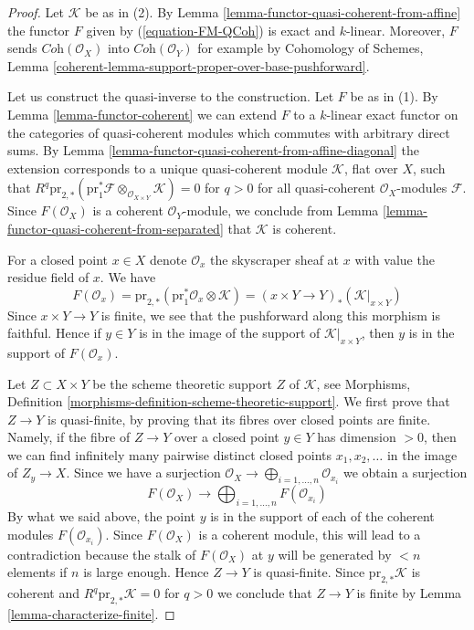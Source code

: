 \begin{proof}
Let $\mathcal{K}$ be as in (2). By
Lemma \ref{lemma-functor-quasi-coherent-from-affine}
the functor $F$ given by (\ref{equation-FM-QCoh}) is exact and $k$-linear.
Moreover, $F$ sends $\textit{Coh}(\mathcal{O}_X)$ into
$\textit{Coh}(\mathcal{O}_Y)$ for example by
Cohomology of Schemes, Lemma
\ref{coherent-lemma-support-proper-over-base-pushforward}.

\medskip\noindent
Let us construct the quasi-inverse to the construction. Let $F$ be
as in (1). By Lemma \ref{lemma-functor-coherent} we can extend $F$
to a $k$-linear exact functor on the
categories of quasi-coherent modules which commutes with arbitrary direct sums.
By Lemma \ref{lemma-functor-quasi-coherent-from-affine-diagonal}
the extension corresponds to a unique quasi-coherent module
$\mathcal{K}$, flat over $X$, such that
$R^q\text{pr}_{2, *}(\text{pr}_1^*\mathcal{F}
\otimes_{\mathcal{O}_{X \times Y}} \mathcal{K}) = 0$ for $q > 0$
for all quasi-coherent $\mathcal{O}_X$-modules $\mathcal{F}$.
Since $F(\mathcal{O}_X)$ is a coherent $\mathcal{O}_Y$-module, we
conclude from Lemma \ref{lemma-functor-quasi-coherent-from-separated}
that $\mathcal{K}$ is coherent.

\medskip\noindent
For a closed point $x \in X$ denote $\mathcal{O}_x$ the skyscraper sheaf
at $x$ with value the residue field of $x$. We have
$$
F(\mathcal{O}_x) =
\text{pr}_{2, *}(\text{pr}_1^*\mathcal{O}_x \otimes \mathcal{K}) =
(x \times Y \to Y)_*(\mathcal{K}|_{x \times Y})
$$
Since $x \times Y \to Y$ is finite, we see that the pushforward along
this morphism is faithful. Hence if $y \in Y$ is in the image of the
support of $\mathcal{K}|_{x \times Y}$, then $y$ is in the support of
$F(\mathcal{O}_x)$.

\medskip\noindent
Let $Z \subset X \times Y$ be the scheme theoretic support $Z$ of
$\mathcal{K}$, see
Morphisms, Definition \ref{morphisms-definition-scheme-theoretic-support}.
We first prove that $Z \to Y$ is quasi-finite, by proving that its fibres
over closed points are finite. Namely, if the fibre of $Z \to Y$ over a
closed point $y \in Y$ has dimension $> 0$, then we can find infinitely
many pairwise distinct closed points $x_1, x_2, \ldots$ in the image of
$Z_y \to X$. Since we have a surjection
$\mathcal{O}_X \to \bigoplus_{i = 1, \ldots, n} \mathcal{O}_{x_i}$
we obtain a surjection
$$
F(\mathcal{O}_X) \to \bigoplus\nolimits_{i = 1, \ldots, n} F(\mathcal{O}_{x_i})
$$
By what we said above, the point $y$ is in the support of each
of the coherent modules $F(\mathcal{O}_{x_i})$. Since $F(\mathcal{O}_X)$
is a coherent module, this will lead to a contradiction because
the stalk of $F(\mathcal{O}_X)$ at $y$ will be generated by $< n$ elements
if $n$ is large enough. Hence $Z \to Y$ is quasi-finite.
Since $\text{pr}_{2, *}\mathcal{K}$ is coherent and
$R^q\text{pr}_{2, *}\mathcal{K} = 0$ for $q > 0$ we conclude
that $Z \to Y$ is finite by Lemma \ref{lemma-characterize-finite}.
\end{proof}

